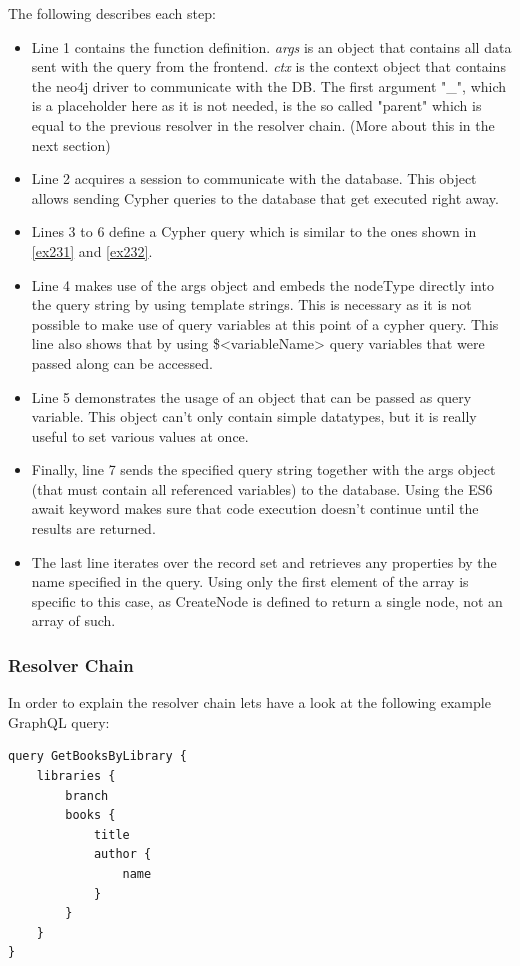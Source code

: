 The following describes each step:
\begin{itemize}
\item Line 1 contains the function definition. \emph{args} is an object that contains all data sent with the query from the frontend. \emph{ctx} is the context object that contains the neo4j driver to communicate with the DB. The first argument "\_", which is a placeholder here as it is not needed, is the so called "parent" which is equal to the previous resolver in the resolver chain. (More about this in the next section)
\item Line 2 acquires a session to communicate with the database. \cite{Neo4jDriver} This object allows sending Cypher queries to the database that get executed right away.
\item Lines 3 to 6 define a Cypher query which is similar to the ones shown in \autoref{ex231} and \autoref{ex232}. 
\item Line 4 makes use of the args object and embeds the nodeType directly into the query string by using template strings. This is necessary as it is not possible to make use of query variables at this point of a cypher query. This line also shows that by using \$<variableName> query variables that were passed along can be accessed.
\item Line 5 demonstrates the usage of an object that can be passed as query variable. This object can't only contain simple datatypes, but it is really useful to set various values at once.
\item Finally, line 7 sends the specified query string together with the args object (that must contain all referenced variables) to the database. Using the ES6 await keyword makes sure that code execution doesn't continue until the results are returned.
\item The last line iterates over the record set and retrieves any properties by the name specified in the query. Using only the first element of the array is specific to this case, as CreateNode is defined to return a single node, not an array of such.
\end{itemize}

\subsubsection{Resolver Chain}
In order to explain the resolver chain lets have a look at the following example GraphQL query: \citep[with adaptions]{ApolloResChain}
\lstset{language=GraphQL}
\begin{lstlisting}[label={ex242},caption={GraphQL query to fetch all books with their title and author name of all libraries}]
query GetBooksByLibrary {
	libraries { 
		branch 
		books { 
			title 
			author { 
				name 
			} 
		} 
	} 
}
\end{lstlisting}

